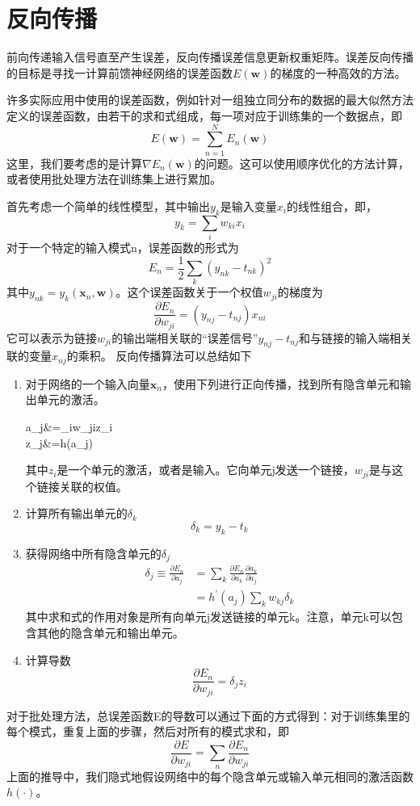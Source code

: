 \chapter{反向传播}
前向传递输入信号直至产生误差，反向传播误差信息更新权重矩阵。误差反向传播的目标是寻找一计算前馈神经网络的误差函数$E(\boldsymbol{w})$的梯度的一种高效的方法。

许多实际应用中使用的误差函数，例如针对一组独立同分布的数据的最大似然方法定义的误差函数，由若干的求和式组成，每一项对应于训练集的一个数据点，即
\begin{equation}
E(\boldsymbol{w})=\sum_{n=1}^{N}E_n(\boldsymbol{w})
\end{equation}
这里，我们要考虑的是计算$\nabla E_n(\boldsymbol{w})$的问题。这可以使用顺序优化的方法计算，或者使用批处理方法在训练集上进行累加。

首先考虑一个简单的线性模型，其中输出$y_k$是输入变量$x_i$的线性组合，即，
\begin{equation}
y_k=\sum_i w_{ki}x_i
\end{equation}
对于一个特定的输入模式n，误差函数的形式为
\begin{equation}
E_n=\frac{1}{2}\sum_k(y_{nk}-t_{nk})^2
\end{equation}
其中$y_{nk}=y_k(\boldsymbol{x}_n,\boldsymbol{w})$。这个误差函数关于一个权值$w_{ji}$的梯度为
\begin{equation}
\frac{\partial E_n}{\partial w_{ji}}=(y_{nj}-t_{nj})x_{ni}
\end{equation}
它可以表示为链接$w_{ji}$的输出端相关联的“误差信号”$y_{nj}-t_{nj}$和与链接的输入端相关联的变量$x_{nj}$的乘积。
反向传播算法可以总结如下 
\begin{enumerate}
	\item 对于网络的一个输入向量$\boldsymbol{x}_n$，使用下列进行正向传播，找到所有隐含单元和输出单元的激活。
	\begin{flalign}
	a_j&=\sum_iw_{ji}z_i\\
	z_j&=h(a_j)
	\end{flalign}
	其中$z_i$是一个单元的激活，或者是输入。它向单元j发送一个链接，$w_{ji}$是与这个链接关联的权值。
	\item 计算所有输出单元的$\delta_k$
	\begin{equation}
	\delta_k=y_k-t_k
	\end{equation}
	\item 获得网络中所有隐含单元的$\delta_j$
	\begin{equation}
	\begin{aligned}
	\delta_j\equiv \frac{\partial E_n}{\partial a_j}&=\sum_k \frac{\partial E_n}{\partial a_k}\frac{\partial a_k}{\partial a_j}\\
	&=h^{'}(a_j)\sum_k w_{kj}\delta_k
	\end{aligned}
	\end{equation}
	其中求和式的作用对象是所有向单元j发送链接的单元k。注意，单元k可以包含其他的隐含单元和输出单元。
	\item 计算导数
	\begin{equation}
	\frac{\partial E_n}{\partial w_{ji}}=\delta_jz_i
	\end{equation}
\end{enumerate}
对于批处理方法，总误差函数E的导数可以通过下面的方式得到：对于训练集里的每个模式，重复上面的步骤，然后对所有的模式求和，即
\begin{equation}
\frac{\partial E}{\partial w_{ji}}=\sum_{n}\frac{\partial E_n}{\partial w_{ji}}
\end{equation}
上面的推导中，我们隐式地假设网络中的每个隐含单元或输入单元相同的激活函数$h(\cdot)$。